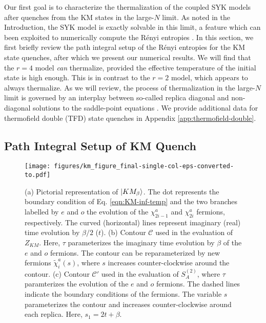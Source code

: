 \documentclass[reprint, floatfix,eqsecnum,superscriptaddress,preprint,nofootinbib,onecolumn,amsmath,amssymb,aps,prb]{revtex4-2}
\newcommand{\tchi}{\tilde{\chi}}
\begin{document}
Our first goal is to %
characterize the thermalization of the coupled SYK models after quenches from the 
KM states in the large-$N$ limit. As noted in the Introduction, the SYK model is exactly solvable in this limit, a feature which can been exploited to numerically compute the R\'enyi entropies %
\cite{Penington2019,Chen2020,Zhang2020a,Haldar2020,Zhang2020b,Jian2021}.
In this section, we first briefly review the path integral setup of the R\'enyi entropies for the %
KM state quenches, after which we present our numerical results. 
We will find that the $r=4$ model \emph{can} thermalize, provided the effective temperature of the initial state is high enough. %
This is in contrast to the $r=2$ model, which appears to always thermalize. As we will review, the process of thermalization in the large-$N$ limit is governed by an interplay between so-called replica diagonal and non-diagonal solutions to the saddle-point equations \cite{Penington2019,Chen2020}. We provide additional data for thermofield double (TFD) state quenches in Appendix \ref{app:thermofield-double}.

\subsection{Path Integral Setup of KM Quench}


\begin{figure}%
  \texttt{[image: figures/km\_figure\_final-single-col-eps-converted-to.pdf]}
  \caption{ (a) Pictorial representation of $\ket{KM_\beta}$. The dot represents the boundary condition of Eq. \eqref{eqn:KM-inf-temp} and the two branches labelled by $e$ and $o$ the evolution of the $\chi_{2i-1}^a$ and $\chi_{2i}^a$ fermions, respectively. The curved (horizontal) lines represent imaginary (real) time evolution by $\beta/2$ ($t$).  (b) Contour $\mathcal{C}$ used in the evaluation of $Z_{KM}$. Here, $\tau$ parameterizes the imaginary time evolution by $\beta$ of the $e$ and $o$ fermions. The contour can be reparameterized by new fermions $\tchi^a_i(s)$, where $s$ increases counter-clockwise around the contour. (c) Contour $\mathcal{C}'$ used in the evaluation of $S_A^{(2)}$, where $\tau$ paramterizes the evolution of the $e$ and $o$ fermions. The dashed lines indicate the boundary conditions of the fermions. The variable $s$ parameterizes the contour and increases counter-clockwise around each replica. Here, $s_1 = 2t+\beta$. 
  } 
  \label{fig:km-setup}
\end{figure}
\end{document}

